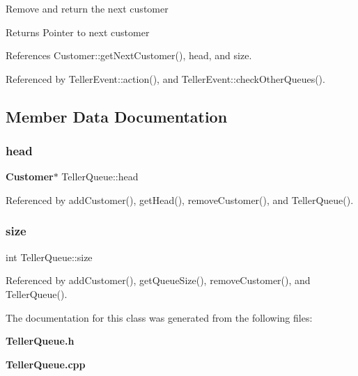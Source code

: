 Remove and return the next customer \begin{DoxyReturn}{Returns}
Pointer to next customer 
\end{DoxyReturn}


References Customer\+::get\+Next\+Customer(), head, and size.



Referenced by Teller\+Event\+::action(), and Teller\+Event\+::check\+Other\+Queues().



\subsection{Member Data Documentation}
\mbox{\label{classTellerQueue_a223a937050c144ecf0a13ac16dbce3f6}} 
\subsubsection{head}
{\footnotesize\ttfamily \textbf{ Customer}$\ast$ Teller\+Queue\+::head\hspace{0.3cm}{\ttfamily [private]}}



Referenced by add\+Customer(), get\+Head(), remove\+Customer(), and Teller\+Queue().

\mbox{\label{classTellerQueue_a9773faab8e4c6cf4fb55602acaac7b6d}} 
\subsubsection{size}
{\footnotesize\ttfamily int Teller\+Queue\+::size\hspace{0.3cm}{\ttfamily [private]}}



Referenced by add\+Customer(), get\+Queue\+Size(), remove\+Customer(), and Teller\+Queue().



The documentation for this class was generated from the following files\+:\begin{DoxyCompactItemize}
\item 
\textbf{ Teller\+Queue.\+h}\item 
\textbf{ Teller\+Queue.\+cpp}\end{DoxyCompactItemize}
